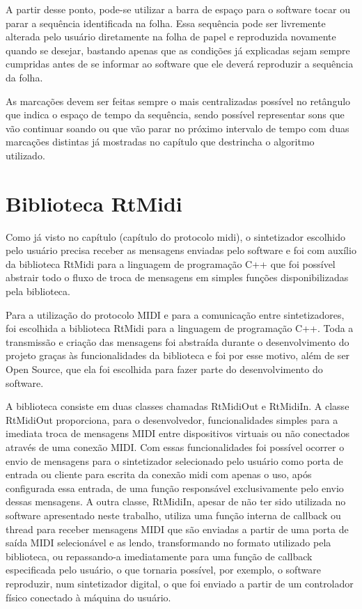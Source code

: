 \documentclass[12pt]{report}
\begin{document}
A partir desse ponto, pode-se utilizar a barra de espaço para o software tocar ou parar a sequência identificada na folha. Essa sequência pode ser livremente alterada pelo usuário diretamente na folha de papel e reproduzida novamente quando se desejar, bastando apenas que as condições já explicadas sejam sempre cumpridas antes de se informar ao software que ele deverá reproduzir a sequência da folha.

As marcações devem ser feitas sempre o mais centralizadas possível no retângulo que indica o espaço de tempo da sequência, sendo possível representar sons que vão continuar soando ou que vão parar no próximo intervalo de tempo com duas marcações distintas já mostradas no capítulo que destrincha o algoritmo utilizado.

\chapter{Biblioteca RtMidi}

Como já visto no capítulo (capítulo do protocolo midi), o sintetizador escolhido pelo usuário precisa receber as mensagens enviadas pelo software e foi com auxílio da biblioteca RtMidi para a linguagem de programação C++ que foi possível abstrair todo o fluxo de troca de mensagens em simples funções disponibilizadas pela biblioteca.

Para a utilização do protocolo MIDI e para a comunicação entre sintetizadores, foi escolhida a biblioteca RtMidi para a linguagem de programação C++. Toda a transmissão e criação das mensagens foi abstraída durante o desenvolvimento do projeto graças às funcionalidades da biblioteca e foi por esse motivo, além de ser Open Source, que ela foi escolhida para fazer parte do desenvolvimento do software.

A biblioteca consiste em duas classes chamadas RtMidiOut e RtMidiIn. A classe RtMidiOut proporciona, para o desenvolvedor, funcionalidades simples para a imediata troca de mensagens MIDI entre dispositivos virtuais ou não conectados através de uma conexão MIDI. Com essas funcionalidades foi possível ocorrer o envio de mensagens para o sintetizador selecionado pelo usuário como porta de entrada ou cliente para escrita da conexão midi com apenas o uso, após configurada essa entrada, de uma função responsável exclusivamente pelo envio dessas mensagens. A outra classe, RtMidiIn, apesar de não ter sido utilizada no software apresentado neste trabalho, utiliza uma função interna de callback ou thread para receber mensagens MIDI que são enviadas a partir de uma porta de saída MIDI selecionável e as lendo, transformando no formato utilizado pela biblioteca, ou repassando-a imediatamente para uma função de callback especificada pelo usuário, o que tornaria possível, por exemplo, o software reproduzir, num sintetizador digital, o que foi enviado a partir de um controlador físico conectado à máquina do usuário.
\end{document}
